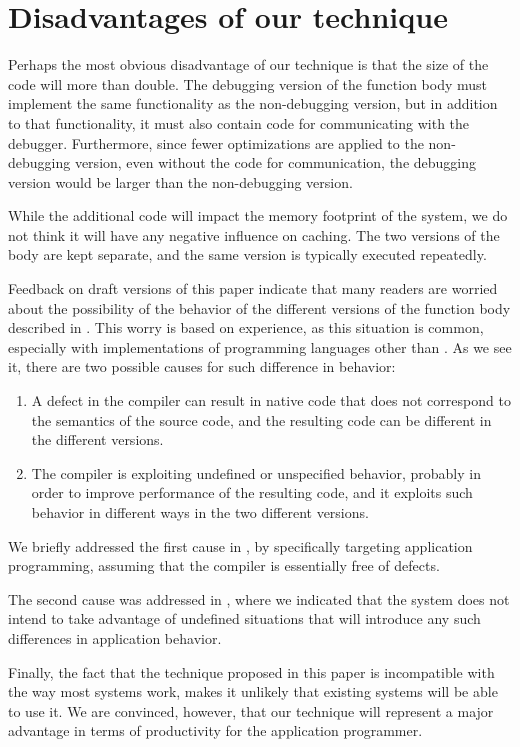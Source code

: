 \section{Disadvantages of our technique}

Perhaps the most obvious disadvantage of our technique is that the
size of the code will more than double.  The debugging version of the
function body must implement the same functionality as the
non-debugging version, but in addition to that functionality, it must
also contain code for communicating with the debugger.  Furthermore,
since fewer optimizations are applied to the non-debugging version,
even without the code for communication, the debugging version would
be larger than the non-debugging version.

While the additional code will impact the memory footprint of the
system, we do not think it will have any negative influence on
caching.  The two versions of the body are kept separate, and the same
version is typically executed repeatedly.

Feedback on draft versions of this paper indicate that many readers
are worried about the possibility of the behavior of the different
versions of the function body described in
.  This worry is based on experience,
as this situation is common, especially with implementations of
programming languages other than \commonlisp{}.  As we see it, there
are two possible causes for such difference in behavior:

\begin{enumerate}
\item A defect in the compiler can result in native code that does not
  correspond to the semantics of the source code, and the resulting
  code can be different in the different versions.
\item The compiler is exploiting undefined or unspecified behavior,
  probably in order to improve performance of the resulting code, and
  it exploits such behavior in different ways in the two different
  versions.
\end{enumerate}

We briefly addressed the first cause in , by
specifically targeting application programming, assuming that the
compiler is essentially free of defects.

The second cause was addressed in , where we
indicated that the \sicl{} system does not intend to take advantage of
undefined situations that will introduce any such differences in
application behavior.

Finally, the fact that the technique proposed in this paper is
incompatible with the way most \commonlisp{} systems work, makes it
unlikely that existing systems will be able to use it.  We are
convinced, however, that our technique will represent a major
advantage in terms of productivity for the application programmer.
